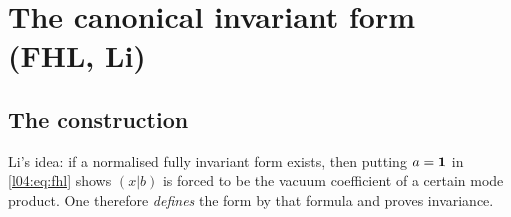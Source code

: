 \section{The canonical invariant form (FHL, Li)}\label{l04:sec:canonical}

\subsection{The construction}

Li's idea: if a normalised fully invariant form exists, then putting $a = \mathbf{1}$ in
\eqref{l04:eq:fhl} shows $(x|b)$ is forced to be the vacuum coefficient of a certain mode product. One
therefore \emph{defines} the form by that formula and proves invariance.

